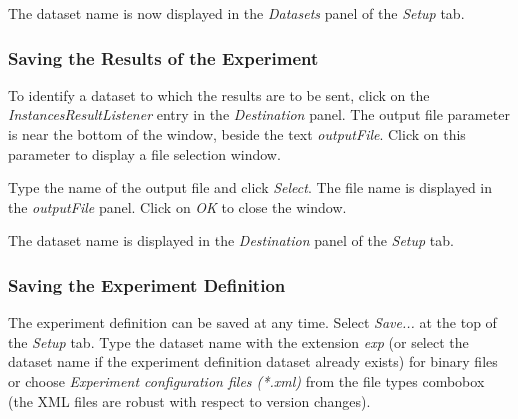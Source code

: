 The dataset name is now displayed in the \textit{Datasets} panel of the \textit{Setup} tab.



\subsubsection*{Saving the Results of the Experiment}

To identify a dataset to which the results are to be sent, click on the \textit{InstancesResultListener} entry in the \textit{Destination} panel. The output file parameter is near the bottom of the window, beside the text \textit{outputFile}. Click on this parameter to display a file selection window.
\begin{center}
\end{center}
	
\begin{center}
\end{center}

Type the name of the output file and click \textit{Select}. The file name is displayed in the \textit{outputFile} panel. Click on \textit{OK} to close the window.
\begin{center}
\end{center}

The dataset name is displayed in the \textit{Destination} panel of the \textit{Setup} tab.
\begin{center}
\end{center}



\subsubsection*{Saving the Experiment Definition}

The experiment definition can be saved at any time. Select \textit{Save...} at the top of the \textit{Setup} tab. Type the dataset name with the extension \textit{exp} (or select the dataset name if the experiment definition dataset already exists) for binary files or choose \textit{Experiment configuration files (*.xml)} from the file types combobox (the XML files are robust with respect to version changes).
\begin{center}
\end{center}


